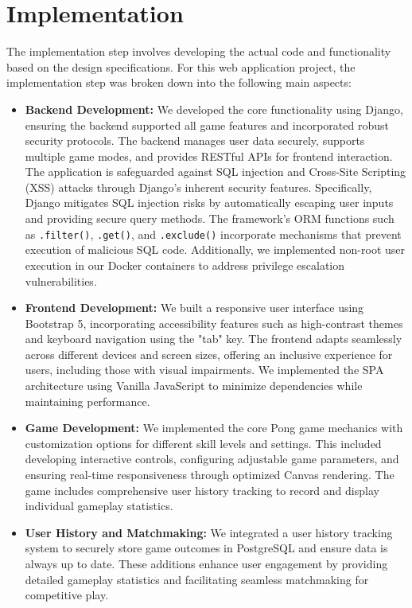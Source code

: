 \section{Implementation}
The implementation step involves developing the actual code and functionality based on the design specifications. For this web application project, the implementation step was broken down into the following main aspects:
\begin{itemize}
    \item \textbf{Backend Development:} We developed the core functionality using Django, ensuring the backend supported all game features and incorporated robust security protocols. The backend manages user data securely, supports multiple game modes, and provides RESTful APIs for frontend interaction. The application is safeguarded against SQL injection and Cross-Site Scripting (XSS) attacks through Django's inherent security features. Specifically, Django mitigates SQL injection risks by automatically escaping user inputs and providing secure query methods. The framework's ORM functions such as \texttt{.filter()}, \texttt{.get()}, and \texttt{.exclude()} incorporate mechanisms that prevent execution of malicious SQL code. Additionally, we implemented non-root user execution in our Docker containers to address privilege escalation vulnerabilities.
    
    \item \textbf{Frontend Development:} We built a responsive user interface using Bootstrap 5, incorporating accessibility features such as high-contrast themes and keyboard navigation using the "tab" key. The frontend adapts seamlessly across different devices and screen sizes, offering an inclusive experience for users, including those with visual impairments. We implemented the SPA architecture using Vanilla JavaScript to minimize dependencies while maintaining performance.
    
    \item \textbf{Game Development:} We implemented the core Pong game mechanics with customization options for different skill levels and settings. This included developing interactive controls, configuring adjustable game parameters, and ensuring real-time responsiveness through optimized Canvas rendering. The game includes comprehensive user history tracking to record and display individual gameplay statistics.
    
    \item \textbf{User History and Matchmaking:} We integrated a user history tracking system to securely store game outcomes in PostgreSQL and ensure data is always up to date. These additions enhance user engagement by providing detailed gameplay statistics and facilitating seamless matchmaking for competitive play.
    

\end{itemize}
